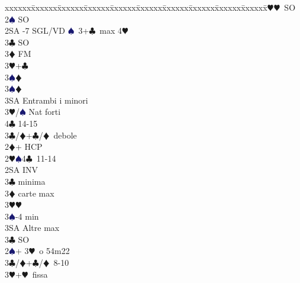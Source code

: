 \documentclass[a4paper,italian]{article}
\newcommand{\BC}{\textcolor{OliveGreen}{$\clubsuit$}}
\newcommand{\BD}{\textcolor{RedOrange}{$\vardiamondsuit$}}
\newcommand{\BH}{\textcolor{Red2}{$\varheartsuit${}}}
\newcommand{\BS}{\textcolor{MidnightBlue}{$\spadesuit${}}}
\newenvironment{bidtable}
{\begin{tabbing}

    xxxxxx\=xxxxxx\=xxxxxx\=xxxxxx\=xxxxxx\=xxxxxx\=xxxxxx\=xxxxxx\=xxxxxx\=xxxxxx\=\kill}
{\end{tabbing} }%
\begin{document}
\begin{multicols}{2}
                                        \begin{bidtable}
                                            2\BH {}\BH\ SO\\
                                            2\BS \> SO\\
                                            2SA -7 SGL/VD \BS\ 3+\BC\ max 4\BH \+\\
                                            3\BC \> SO\\
                                            3\BD \> FM\+\\
                                            3\BH {}+\BC \+\\
                                            3\BS {}\BD \-\\
                                            3\BS {}\BD \\
                                            3SA \> Entrambi i minori\-\\
                                            3\BH/\BS \> Nat forti\\
                                            4\BC {} 14-15\-\\
                                            3\BC/\BD {}+\BC /\BD\ debole\\
                                            2\BD {}+ HCP\+\\
                                            2\BH {}\BS 4\BC\ 11-14\+\\
                                            2SA \> INV\+\\
                                            3\BC {} minima\\
                                            3\BD {} carte max\\
                                            3\BH {}\BH \\
                                            3\BS {}-4 min\\
                                            3SA \> Altre max\-\\
                                            3\BC \> SO\-\\
                                            2\BS {}+ 3\BH\ o 54m22\+\\
                                            3\BC/\BD {}+\BC /\BD\ 8-10\\
                                            3\BH {}+\BH\ fissa\\

\end{bidtable}
\end{multicols}
\end{document}
